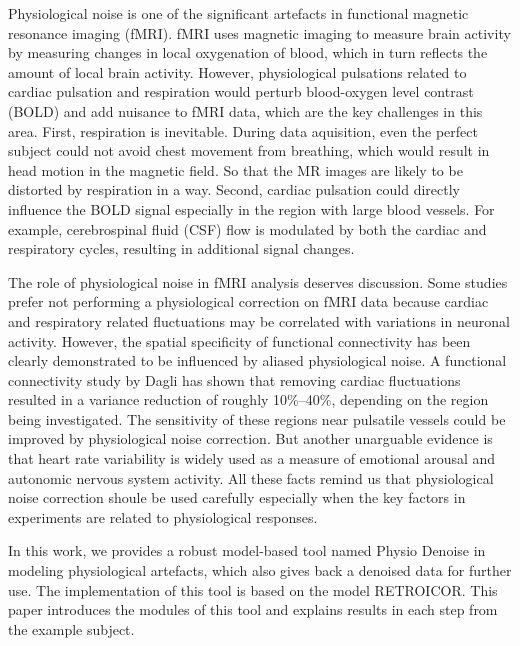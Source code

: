 Physiological noise is one of the significant artefacts in functional magnetic resonance imaging (fMRI).
fMRI uses magnetic imaging to measure brain activity by measuring changes in local oxygenation of blood, which in turn reflects the amount of local brain activity. \cite{poldrack2011handbook}
However, physiological pulsations related to cardiac pulsation and respiration would perturb blood-oxygen level contrast (BOLD) and add nuisance to fMRI data, which are the key challenges in this area. First, respiration is inevitable. 
During data aquisition, even the perfect subject could not avoid chest movement from breathing, which would result in head motion in the magnetic field. 
So that the MR images are likely to be distorted by respiration in a way.
Second, cardiac pulsation could directly influence the BOLD signal especially in the region with large blood vessels. 
For example, cerebrospinal fluid (CSF) flow is modulated by both the cardiac and respiratory cycles, resulting in additional signal changes.\cite{birn2012role}

The role of physiological noise in fMRI analysis deserves discussion. 
Some studies prefer not performing a physiological correction on fMRI data because cardiac and respiratory related fluctuations may be correlated with variations in neuronal activity.\cite{birn2012role} 
However, the spatial specificity of functional connectivity has been clearly demonstrated to be influenced by aliased physiological noise.\cite{lowe1998functional}
A functional connectivity study\cite{dagli1999localization} by Dagli has shown that removing cardiac fluctuations resulted in a variance reduction of roughly 10\%–40\%, 
depending on the region being investigated.\cite{dagli1999localization}
The sensitivity of these regions near pulsatile vessels could be improved by physiological noise correction. 
But another unarguable evidence is that heart rate variability is widely used as a measure of emotional arousal and autonomic nervous system activity.\cite{birn2012role} 
All these facts remind us that physiological noise correction shoule be used carefully especially when the key factors in experiments are related to physiological responses.

In this work, we provides a robust model-based tool named Physio Denoise in modeling physiological artefacts, which also gives back a denoised data for further use. 
The implementation of this tool is based on the model RETROICOR.\cite{glover2000image}
This paper introduces the modules of this tool and explains results in each step from the example subject.
